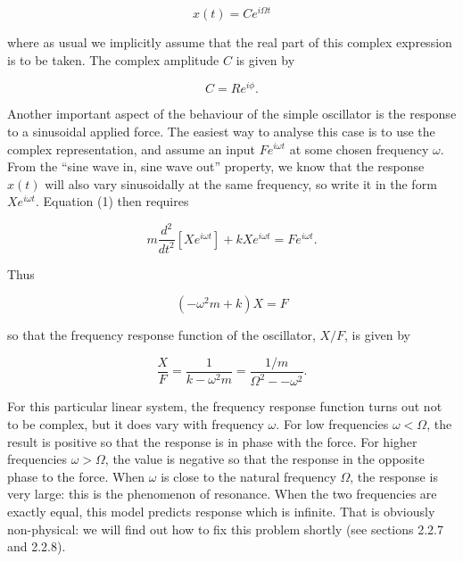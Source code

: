   \begin{equation*}x(t)= C e^{i \Omega t} \tag{8}\end{equation*} 

  \noindent{}where as usual we implicitly assume that the real part of this 
  complex expression is to be taken. The complex amplitude $C$ is given by 

  \begin{equation*}C=R e^{i \phi}. \tag{9}\end{equation*} 

  Another important aspect of the behaviour of the simple oscillator is the 
  response to a sinusoidal applied force. The easiest way to analyse this case 
  is to use the complex representation, and assume an input $Fe^{i \omega t}$ 
  at some chosen frequency $\omega$. From the ``sine wave in, sine wave out'' 
  property, we know that the response $x(t)$ will also vary sinusoidally at the 
  same frequency, so write it in the form $X e^{i \omega t}$. Equation (1) then 
  requires 

  \begin{equation*}m \dfrac{d^2}{dt^2}\left[X e^{i \omega t} \right] + kX e^{i 
  \omega t}=Fe^{i \omega t} . \tag{10}\end{equation*} 

  Thus 

  \begin{equation*}(- \omega^2 m+k)X=F \tag{11}\end{equation*} 

  \noindent{}so that the frequency response function of the oscillator, $X/F$, 
  is given by 

  \begin{equation*}\dfrac{X}{F} = \dfrac{1}{k-\omega^2 m}=\dfrac{1/m}{\Omega^2 
  -- \omega^2} \tag{12}. \end{equation*} 

  For this particular linear system, the frequency response function turns out 
  not to be complex, but it does vary with frequency $\omega$. For low 
  frequencies $\omega < \Omega$, the result is positive so that the response is 
  in phase with the force. For higher frequencies $\omega > \Omega$, the value 
  is negative so that the response in the opposite phase to the force. When 
  $\omega$ is close to the natural frequency $\Omega$, the response is very 
  large: this is the phenomenon of resonance. When the two frequencies are 
  exactly equal, this model predicts response which is infinite. That is 
  obviously non-physical: we will find out how to fix this problem shortly (see 
  sections 2.2.7 and 2.2.8). 